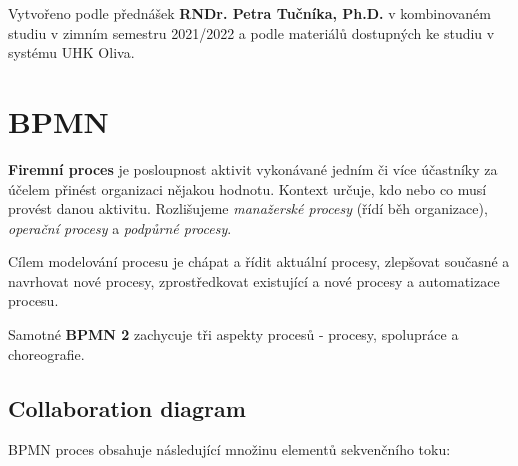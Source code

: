 \epigraph{Vytvořeno podle přednášek \textbf{RNDr. Petra Tučníka, Ph.D.} v kombinovaném studiu v zimním semestru 2021/2022 a podle materiálů dostupných ke studiu v systému UHK Oliva.}{}

\section{BPMN}

\textbf{Firemní proces} je posloupnost aktivit vykonávané jedním či více účastníky za účelem přinést organizaci nějakou hodnotu. Kontext určuje, kdo nebo co musí provést danou aktivitu. Rozlišujeme \textit{manažerské procesy} (řídí běh organizace), \textit{operační procesy} a \textit{podpůrné procesy}.

Cílem modelování procesu je chápat a řídit aktuální procesy, zlepšovat současné a navrhovat nové procesy, zprostředkovat existující a nové procesy a automatizace procesu.

Samotné \textbf{BPMN 2} zachycuje tři aspekty procesů - procesy, spolupráce a choreografie.

\subsection{Collaboration diagram}

BPMN proces obsahuje následující množinu elementů sekvenčního toku:

